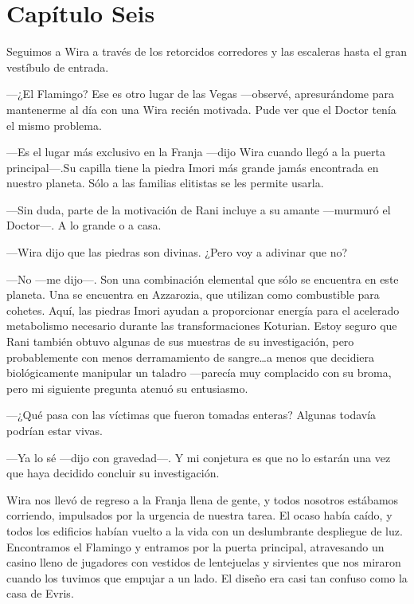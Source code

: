 \chapter*{Capítulo Seis}

Seguimos a Wira a través de los retorcidos corredores y las escaleras
hasta el gran vestíbulo de entrada.

---¿El Flamingo? Ese es otro lugar de las Vegas ---observé,
apresurándome para mantenerme al día con una Wira recién motivada. Pude
ver que el Doctor tenía el mismo problema.

---Es el lugar más exclusivo en la Franja ---dijo Wira cuando llegó a la
puerta principal---.Su capilla tiene la piedra Imori más grande jamás
encontrada en nuestro planeta. Sólo a las familias elitistas se les
permite usarla.

---Sin duda, parte de la motivación de Rani incluye a su amante
---murmuró el Doctor---. A lo grande o a casa.

---Wira dijo que las piedras son divinas. ¿Pero voy a adivinar que no?

---No ---me dijo---. Son una combinación elemental que sólo se encuentra
en este planeta. Una se encuentra en Azzarozia, que utilizan como
combustible para cohetes. Aquí, las piedras Imori ayudan a proporcionar
energía para el acelerado metabolismo necesario durante las
transformaciones Koturian. Estoy seguro que Rani también obtuvo algunas
de sus muestras de su investigación, pero probablemente con menos
derramamiento de sangre\ldots{}a menos que decidiera biológicamente
manipular un taladro ---parecía muy complacido con su broma, pero mi
siguiente pregunta atenuó su entusiasmo.

---¿Qué pasa con las víctimas que fueron tomadas enteras? Algunas
todavía podrían estar vivas.

---Ya lo sé ---dijo con gravedad---. Y mi conjetura es que no lo estarán
una vez que haya decidido concluir su investigación.

Wira nos llevó de regreso a la Franja llena de gente, y todos nosotros
estábamos corriendo, impulsados por la urgencia de nuestra tarea. El
ocaso había caído, y todos los edificios habían vuelto a la vida con un
deslumbrante despliegue de luz. Encontramos el Flamingo y entramos por
la puerta principal, atravesando un casino lleno de jugadores con
vestidos de lentejuelas y sirvientes que nos miraron cuando los tuvimos
que empujar a un lado. El diseño era casi tan confuso como la casa de
Evris.

